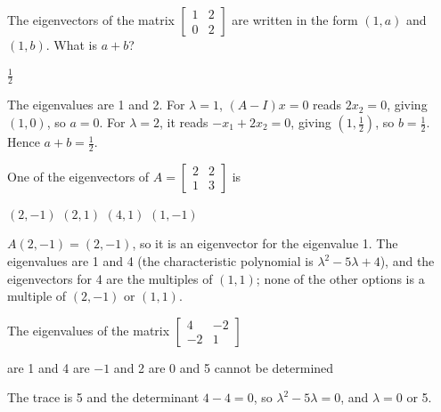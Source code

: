\begin{question}[id=gate-me2008-2, source=GATE ME 2008, marks=2]
The eigenvectors of the matrix $\begin{bmatrix} 1 & 2 \\ 0 & 2 \end{bmatrix}$ are written in the form $(1, a)$ and $(1, b)$. What is $a + b$?
\begin{options}
  \correct $\frac{1}{2}$
\end{options}
\begin{solution}
The eigenvalues are 1 and 2. For $\lambda = 1$, $(A - I)x = 0$ reads $2x_2 = 0$, giving $(1, 0)$, so $a = 0$. For $\lambda = 2$, it reads $-x_1 + 2x_2 = 0$, giving $(1, \frac{1}{2})$, so $b = \frac{1}{2}$. Hence $a + b = \frac{1}{2}$.
\end{solution}
\end{question}

\begin{question}[id=gate-me2010-1, source=GATE ME 2010]
One of the eigenvectors of $A = \begin{bmatrix} 2 & 2 \\ 1 & 3 \end{bmatrix}$ is
\begin{options}
  \correct $(2, -1)$
  \option $(2, 1)$
  \option $(4, 1)$
  \option $(1, -1)$
\end{options}
\begin{solution}
$A(2, -1) = (2, -1)$, so it is an eigenvector for the eigenvalue 1. The eigenvalues are 1 and 4 (the characteristic polynomial is $\lambda^2 - 5\lambda + 4$), and the eigenvectors for 4 are the multiples of $(1, 1)$; none of the other options is a multiple of $(2, -1)$ or $(1, 1)$.
\end{solution}
\end{question}

\begin{question}[id=gate-ce2004-2, source=GATE CE 2004]
The eigenvalues of the matrix $\begin{bmatrix} 4 & -2 \\ -2 & 1 \end{bmatrix}$
\begin{options}
  \option are 1 and 4
  \option are $-1$ and 2
  \correct are 0 and 5
  \option cannot be determined
\end{options}
\begin{solution}
The trace is 5 and the determinant $4 - 4 = 0$, so $\lambda^2 - 5\lambda = 0$, and $\lambda = 0$ or 5.
\end{solution}
\end{question}

